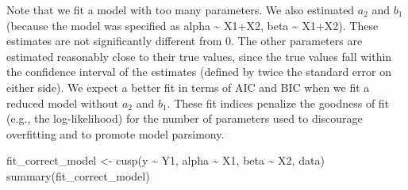 \documentclass[
  a4paper,
  DIV=11,
  numbers=noendperiod,
  oneside]{scrreprt}
\newenvironment{Shaded}{\begin{snugshade}}{\end{snugshade}}
\newcommand{\FunctionTok}[1]{\textcolor[rgb]{0.28,0.35,0.67}{#1}}
\newcommand{\NormalTok}[1]{\textcolor[rgb]{0.00,0.23,0.31}{#1}}
\newcommand{\OtherTok}[1]{\textcolor[rgb]{0.00,0.23,0.31}{#1}}
\newcommand{\SpecialCharTok}[1]{\textcolor[rgb]{0.37,0.37,0.37}{#1}}
\begin{document}
Note that we fit a model with too many parameters. We also estimated
\(a_{2}\) and \(b_{1}\) (because the model was specified as alpha
\textasciitilde{} X1+X2, beta \textasciitilde{} X1+X2). These estimates
are not significantly different from 0. The other parameters are
estimated reasonably close to their true values, since the true values
fall within the confidence interval of the estimates (defined by twice
the standard error on either side). We expect a better fit in terms of
AIC and BIC when we fit a reduced model without \(a_{2}\) and \(b_{1}\).
These fit indices penalize the goodness of fit (e.g., the
log-likelihood) for the number of parameters used to discourage
overfitting and to promote model parsimony.

\begin{Shaded}
\begin{Highlighting}[]
\NormalTok{fit\_correct\_model }\OtherTok{\textless{}{-}} \FunctionTok{cusp}\NormalTok{(y }\SpecialCharTok{\textasciitilde{}}\NormalTok{ Y1, alpha }\SpecialCharTok{\textasciitilde{}}\NormalTok{ X1, beta }\SpecialCharTok{\textasciitilde{}}\NormalTok{ X2, data) }
\FunctionTok{summary}\NormalTok{(fit\_correct\_model)}
\end{Highlighting}
\end{Shaded}
\end{document}
